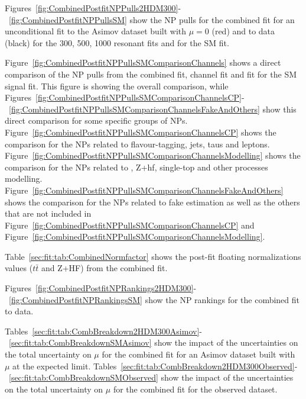 Figures~\ref{fig:CombinedPostfitNPPulls2HDM300}-~\ref{fig:CombinedPostfitNPPullsSM} show the NP pulls for the combined fit for an unconditional fit to the Asimov dataset built with $\mu=0$ (red) and to data (black) for the 300, 500, 1000 resonant fits and for the SM fit. 


Figure~\ref{fig:CombinedPostfitNPPullsSMComparisonChannels} shows a direct comparison of the NP pulls from the combined fit, \hadhad channel fit and \lephad fit for the SM signal fit. This figure is showing the overall comparison, while Figures~\ref{fig:CombinedPostfitNPPullsSMComparisonChannelsCP}-~\ref{fig:CombinedPostfitNPPullsSMComparisonChannelsFakeAndOthers} show this direct comparison for some specific groups of NPs. Figure~\ref{fig:CombinedPostfitNPPullsSMComparisonChannelsCP} shows the comparison for the NPs related to flavour-tagging, jets, taus and leptons. Figure~\ref{fig:CombinedPostfitNPPullsSMComparisonChannelsModelling} shows the comparison for the NPs related to \ttbar, Z+hf, single-top and other processes modelling. Figure~\ref{fig:CombinedPostfitNPPullsSMComparisonChannelsFakeAndOthers} shows the comparison for the NPs related to fake \tauhad estimation as well as the others that are not included in Figure~\ref{fig:CombinedPostfitNPPullsSMComparisonChannelsCP} and Figure~\ref{fig:CombinedPostfitNPPullsSMComparisonChannelsModelling}.

Table~\ref{sec:fit:tab:CombinedNormfactor} shows the post-fit floating normalizations values ($t\bar{t}$ and Z+HF) from the combined fit. 

Figures~\ref{fig:CombinedPostfitNPRankings2HDM300}-~\ref{fig:CombinedPostfitNPRankingsSM} show the NP rankings for the combined fit to data.

Tables~\ref{sec:fit:tab:CombBreakdown2HDM300Asimov}-~\ref{sec:fit:tab:CombBreakdownSMAsimov} show the impact of the uncertainties on the total uncertainty on $\mu$ for the combined fit for an Asimov dataset built with $\mu$ at the expected limit. Tables~\ref{sec:fit:tab:CombBreakdown2HDM300Observed}-~\ref{sec:fit:tab:CombBreakdownSMObserved} show the impact of the uncertainties on the total uncertainty on $\mu$ for the combined fit for the observed dataset.

